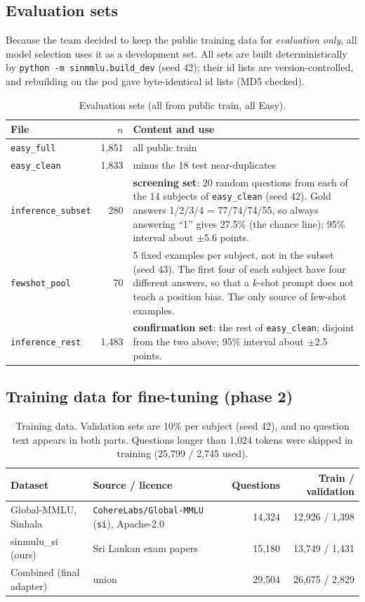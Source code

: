 \documentclass[10pt,a4paper]{article}
\begin{document}
\subsection{Evaluation sets}\label{sec:devsets}
Because the team decided to keep the public training data for \emph{evaluation only}, all model selection uses it as a
development set. All sets are built deterministically by \texttt{python -m sinmmlu.build\_dev} (seed 42); their id lists
are version-controlled, and rebuilding on the pod gave byte-identical id lists (MD5 checked).
\begin{table}[h]
\centering\small
\begin{tabularx}{\linewidth}{lrX}
\toprule
File & $n$ & Content and use\\
\midrule
\texttt{easy\_full} & 1,851 & all public train\\
\texttt{easy\_clean} & 1,833 & minus the 18 test near-duplicates\\
\texttt{inference\_subset} & 280 & \textbf{screening set}: 20 random questions from each of the 14 subjects of
\texttt{easy\_clean} (seed 42). Gold answers 1/2/3/4 = 77/74/74/55, so always answering ``1'' gives 27.5\%
(the chance line); 95\% interval about $\pm$5.6 points.\\
\texttt{fewshot\_pool} & 70 & 5 fixed examples per subject, not in the subset (seed 43). The first four of each subject
have four different answers, so that a $k$-shot prompt does not teach a position bias. The only source of few-shot
examples.\\
\texttt{inference\_rest} & 1,483 & \textbf{confirmation set}: the rest of \texttt{easy\_clean}; disjoint from the two
above; 95\% interval about $\pm$2.5 points.\\
\bottomrule
\end{tabularx}
\caption{Evaluation sets (all from public train, all Easy).}
\end{table}

\subsection{Training data for fine-tuning (phase 2)}\label{sec:trainingdata}
\begin{table}[h]
\centering\small
\begin{tabular}{llrr}
\toprule
Dataset & Source / licence & Questions & Train / validation\\
\midrule
Global-MMLU, Sinhala & \texttt{CohereLabs/Global-MMLU} (\texttt{si}), Apache-2.0 & 14,324 & 12,926 / 1,398\\
sinmulu\_si (ours) & Sri Lankan exam papers & 15,180 & 13,749 / 1,431\\
\midrule
Combined (final adapter) & union & 29,504 & 26,675 / 2,829\\
\bottomrule
\end{tabular}
\caption{Training data. Validation sets are 10\% per subject (seed 42), and no question text appears in both parts.
Questions longer than 1,024 tokens were skipped in training (25,799 / 2,745 used).}
\end{table}
\end{document}
